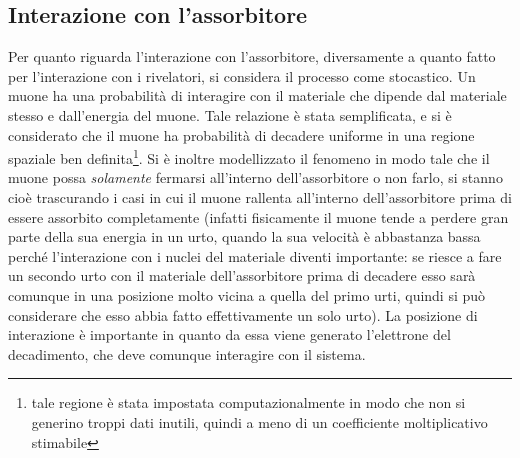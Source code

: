 \subsection{Interazione con l'assorbitore}
Per quanto riguarda l'interazione con l'assorbitore, diversamente a quanto fatto per l'interazione con i rivelatori, si considera il processo come stocastico. Un muone
ha una probabilità di interagire con il materiale che dipende dal materiale stesso e dall'energia del muone. Tale relazione è stata semplificata, e si è considerato che il
muone ha probabilità di decadere uniforme in una regione spaziale ben definita\footnote{tale regione è stata impostata computazionalmente in modo che non si generino troppi
dati inutili, quindi a meno di un coefficiente moltiplicativo stimabile}. Si è inoltre modellizzato il fenomeno in modo tale che il muone possa \textit{solamente} fermarsi all'interno dell'assorbitore o non farlo, si stanno cioè trascurando i casi in cui il muone rallenta all'interno dell'assorbitore prima di essere assorbito completamente (infatti fisicamente il muone tende a perdere gran parte della sua energia in un urto, quando la sua velocit\`a \`e abbastanza bassa perch\'e l'interazione con i nuclei del materiale diventi importante: se riesce a fare un secondo urto con il materiale dell'assorbitore prima di decadere esso sarà comunque in una posizione molto vicina a quella del primo urti, quindi si può considerare che esso abbia fatto effettivamente un solo urto). La posizione di interazione \`e importante in quanto da essa viene generato l'elettrone del decadimento, che deve comunque interagire con il sistema.

